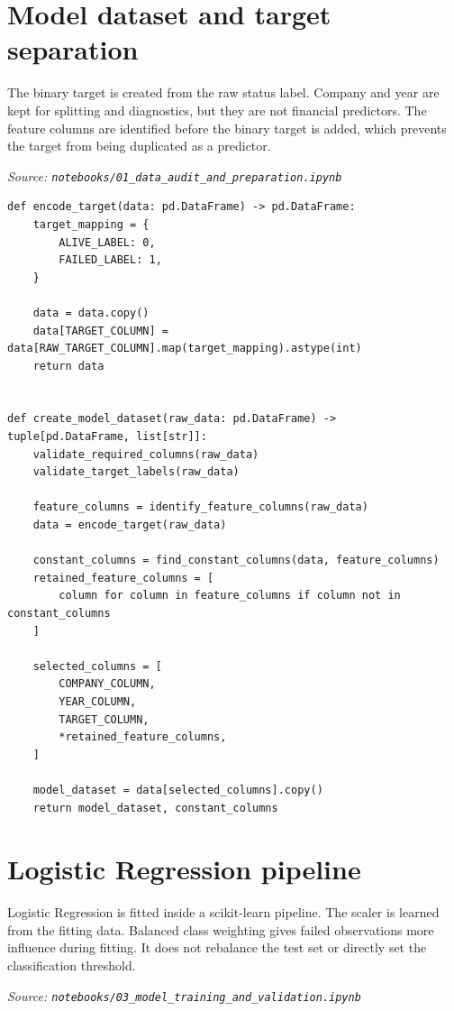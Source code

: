 \documentclass[10pt]{article}
\begin{document}
\section{Model dataset and target separation}

The binary target is created from the raw status label. Company and year are
kept for splitting and diagnostics, but they are not financial predictors. The
feature columns are identified before the binary target is added, which prevents
the target from being duplicated as a predictor.

\textit{Source: \texttt{notebooks/01\_data\_audit\_and\_preparation.ipynb}}

\begin{lstlisting}
def encode_target(data: pd.DataFrame) -> pd.DataFrame:
    target_mapping = {
        ALIVE_LABEL: 0,
        FAILED_LABEL: 1,
    }

    data = data.copy()
    data[TARGET_COLUMN] = data[RAW_TARGET_COLUMN].map(target_mapping).astype(int)
    return data


def create_model_dataset(raw_data: pd.DataFrame) -> tuple[pd.DataFrame, list[str]]:
    validate_required_columns(raw_data)
    validate_target_labels(raw_data)

    feature_columns = identify_feature_columns(raw_data)
    data = encode_target(raw_data)

    constant_columns = find_constant_columns(data, feature_columns)
    retained_feature_columns = [
        column for column in feature_columns if column not in constant_columns
    ]

    selected_columns = [
        COMPANY_COLUMN,
        YEAR_COLUMN,
        TARGET_COLUMN,
        *retained_feature_columns,
    ]

    model_dataset = data[selected_columns].copy()
    return model_dataset, constant_columns
\end{lstlisting}

\section{Logistic Regression pipeline}

Logistic Regression is fitted inside a scikit-learn pipeline. The scaler is
learned from the fitting data. Balanced class weighting gives failed
observations more influence during fitting. It does not rebalance the test set
or directly set the classification threshold.

\textit{Source: \texttt{notebooks/03\_model\_training\_and\_validation.ipynb}}
\end{document}
